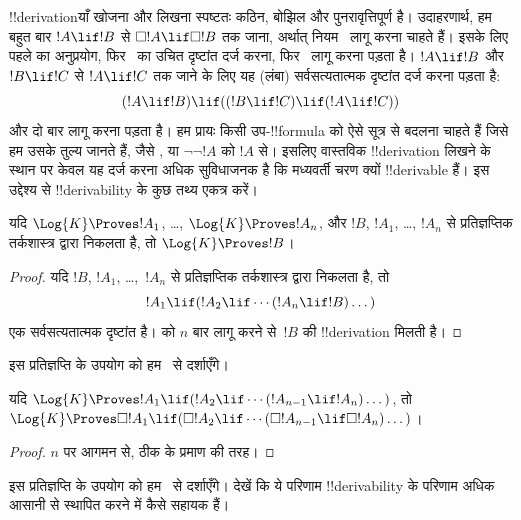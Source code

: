 \documentclass[../../../include/open-logic-section]{subfiles}
\begin{document}


!!{derivation}याँ खोजना और लिखना स्पष्टतः कठिन, बोझिल और पुनरावृत्तिपूर्ण
है। उदाहरणार्थ, हम बहुत बार $!A \lif !B$ से
$\Box !A \lif \Box !B$ तक जाना, अर्थात् नियम~\RK{} लागू करना चाहते हैं।
इसके लिए पहले \Nec{} का अनुप्रयोग, फिर~ का उचित दृष्टांत दर्ज करना,
फिर~\MP{} लागू करना पड़ता है। $!A \lif !B$ और $!B \lif !C$ से
$!A \lif !C$ तक जाने के लिए यह (लंबा) सर्वसत्यतात्मक दृष्टांत दर्ज करना
पड़ता है:
\[
(!A \lif !B) \lif ((!B \lif !C) \lif (!A \lif !C))
\]
और \MP{} दो बार लागू करना पड़ता है। हम प्रायः किसी उप-!!{formula} को ऐसे
सूत्र से बदलना चाहते हैं जिसे हम उसके तुल्य जानते हैं, जैसे
, या $\lnot\lnot !A$ को $!A$ से। इसलिए वास्तविक
!!{derivation} लिखने के स्थान पर केवल यह दर्ज करना अधिक सुविधाजनक है कि
मध्यवर्ती चरण क्यों !!{derivable} हैं। इस उद्देश्य से !!{derivability} के
कुछ तथ्य एकत्र करें।

\begin{prop}
  यदि $\Log{K} \Proves !A_1$, \dots, $\Log{K} \Proves !A_n$, और $!B$,
  $!A_1$, \dots, $!A_n$ से प्रतिज्ञप्तिक तर्कशास्त्र द्वारा निकलता है, तो
  $\Log{K} \Proves !B$।
\end{prop}

\begin{proof}
  यदि $!B$, $!A_1$, \dots,~$!A_n$ से प्रतिज्ञप्तिक तर्कशास्त्र द्वारा
  निकलता है, तो
  \[
  !A_1 \lif (!A_2 \lif \cdots (!A_n \lif !B)\dots)
  \]
  एक सर्वसत्यतात्मक दृष्टांत है। \MP{} को $n$ बार लागू करने से~$!B$ की
  !!{derivation} मिलती है।
\end{proof}

इस प्रतिज्ञप्ति के उपयोग को हम~\PL{} से दर्शाएँगे।

\begin{prop}
  यदि $\Log{K} \Proves !A_1 \lif (!A_2 \lif \cdots (!A_{n-1} \lif
  !A_n)\dots)$, तो $\Log{K} \Proves \Box !A_1 \lif (\Box !A_2 \lif
  \cdots (\Box !A_{n-1} \lif \Box !A_n)\dots)$।
\end{prop}

\begin{proof}
  $n$ पर आगमन से, ठीक  के प्रमाण की तरह।
\end{proof}

इस प्रतिज्ञप्ति के उपयोग को हम~\RK{} से दर्शाएँगे। देखें कि ये परिणाम
!!{derivability} के परिणाम अधिक आसानी से स्थापित करने में कैसे सहायक हैं।
\end{document}

